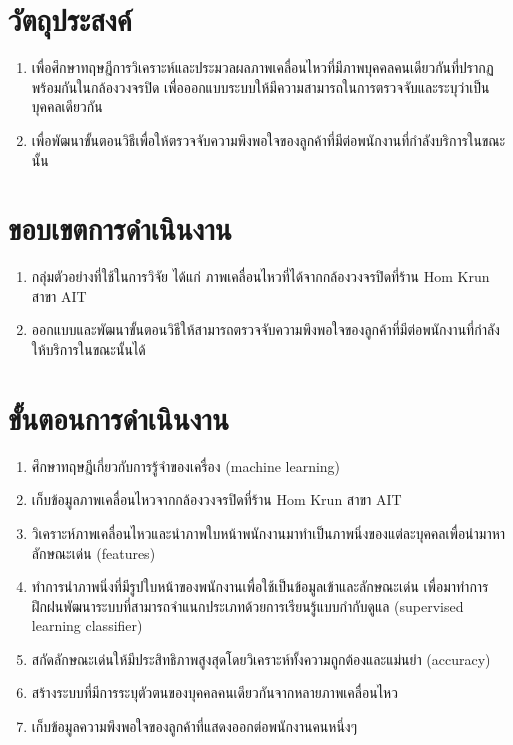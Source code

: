 \section{วัตถุประสงค์}
\begin{enumerate}[label=1.2.\arabic*]
\item{เพื่อศึกษาทฤษฎีการวิเคราะห์และประมวลผลภาพเคลื่อนไหวที่มีภาพบุคคลคนเดียวกันที่ปรากฏพร้อมกันในกล้องวงจรปิด เพื่อออกแบบระบบให้มีความสามารถในการตรวจจับและระบุว่าเป็นบุคคลเดียวกัน}
\item{เพื่อพัฒนาขั้นตอนวิธีเพื่อให้ตรวจจับความพึงพอใจของลูกค้าที่มีต่อพนักงานที่กำลังบริการในขณะนั้น}
\end{enumerate}

\section{ขอบเขตการดำเนินงาน}
\begin{enumerate}[label=1.3.\arabic*]
\item{กลุ่มตัวอย่างที่ใช้ในการวิจัย ได้แก่ ภาพเคลื่อนไหวที่ได้จากกล้องวงจรปิดที่ร้าน
  Hom Krun สาขา AIT}
\item{ออกแบบและพัฒนาขั้นตอนวิธีให้สามารถตรวจจับความพึงพอใจของลูกค้าที่มีต่อพนักงานที่กำลังให้บริการในขณะนั้นได้}
\end{enumerate}

\section{ขั้นตอนการดำเนินงาน}
\begin{enumerate}[label=1.4.\arabic*]
\item{ศึกษาทฤษฎีเกี่ยวกับการรู้จำของเครื่อง (machine learning)}
\item{เก็บข้อมูลภาพเคลื่อนไหวจากกล้องวงจรปิดที่ร้าน
  Hom Krun สาขา AIT}
\item{วิเคราะห์ภาพเคลื่อนไหวและนำภาพใบหน้าพนักงานมาทำเป็นภาพนิ่งของแต่ละบุคคลเพื่อนำมาหาลักษณะเด่น (features)}
\item{ทำการนำภาพนิ่งที่มีรูปใบหน้าของพนักงานเพื่อใช้เป็นข้อมูลเข้าและลักษณะเด่น เพื่อมาทำการฝึกฝนพัฒนาระบบที่สามารถจำแนกประเภทด้วยการเรียนรู้แบบกำกับดูแล (supervised learning classifier)}
\item{สกัดลักษณะเด่นให้มีประสิทธิภาพสูงสุดโดยวิเคราะห์ทั้งความถูกต้องและแม่นยำ (accuracy)}
\item{สร้างระบบที่มีการระบุตัวตนของบุคคลคนเดียวกันจากหลายภาพเคลื่อนไหว}
\item{เก็บข้อมูลความพึงพอใจของลูกค้าที่แสดงออกต่อพนักงานคนหนึ่งๆ}
\end{enumerate}

